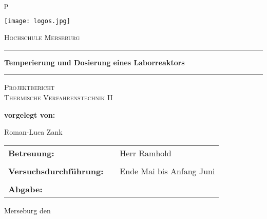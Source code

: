\begin{center}
\begin{tabular}{p{\textwidth}}


\begin{center}
\texttt{[image: logos.jpg]}\\
\end{center}

\begin{center}
	\LARGE{\textsc{Hochschule Merseburg}}
\end{center}

\vspace*{12.5mm}

\rule{\textwidth}{0.4pt}
\begin{center}
\textbf{\Huge{Temperierung und Dosierung eines Laborreaktors}}
\end{center}
\vspace*{-5mm}
\rule{\textwidth}{0.4pt}

\vspace*{12.5mm}

\begin{center}
	\LARGE{\textsc{
			Projektbericht \\
			Thermische Verfahrenstechnik II\\
	}}
\end{center}

\vspace*{12.5mm}

\begin{center}
\Large{\textbf{vorgelegt von:}} \\ 
\end{center}
\begin{center}
\large{Roman-Luca Zank} \\
\end{center}


\vspace*{12.5mm}

\begin{center}
\begin{tabular}{lll}
\large{\textbf{Betreuung:}}&& \large{Herr Ramhold}\\
&&\\
\large{\textbf{Versuchsdurchführung:}}&& \large{Ende Mai bis Anfang Juni}\\
&&\\
\large{\textbf{Abgabe:}}&& \large{\todayDE}\\
\end{tabular}
\end{center}

\end{tabular}
\end{center}
\vfill
\large{Merseburg den \todayDE}
